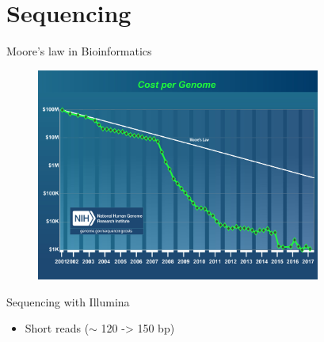 \documentclass[usepdftitle=false]{beamer}
\begin{document}
\section{Sequencing}

\begin{frame}{Moore's law in Bioinformatics}
	\begin{figure}
		\includegraphics[height=7cm]{pictures/costpergenome_2017.jpg}
	\end{figure}
\end{frame}

\begin{frame}{Sequencing with Illumina}
	\begin{figure}
	\end{figure}
	\pause
	\begin{itemize}
		\item Short reads ($\sim$ 120 -> 150 bp)
	\end{itemize}
\end{frame}
\end{document}
